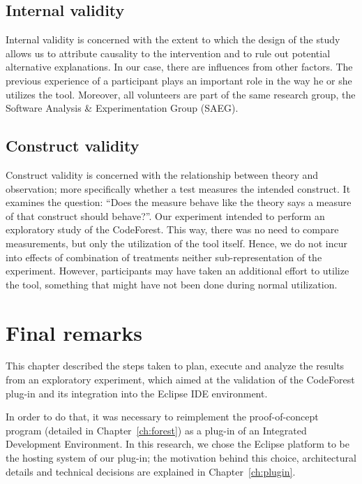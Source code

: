 \subsection{Internal validity}

Internal validity is concerned with the extent to which the design of the
study allows us to attribute causality to the intervention and to rule out
potential alternative explanations. In our case, there are influences from other
factors. The previous experience of a participant plays an important role in the
way he or she utilizes the tool. Moreover, all volunteers are part of the same
research group, the Software Analysis \& Experimentation Group (SAEG).

\subsection{Construct validity}

Construct validity is concerned with the relationship between theory and
observation; more specifically whether a test measures the intended construct.
It examines the question: ``Does the measure behave like the theory says a
measure of that construct should behave?''. Our experiment intended to perform
an exploratory study of the CodeForest. This way, there was no need to compare
measurements, but only the utilization of the tool itself. Hence, we do not
incur into effects of combination of treatments neither sub-representation of
the experiment. However, participants may have taken an additional effort to
utilize the tool, something that might have not been done during normal
utilization.

\section{Final remarks}

This chapter described the steps taken to plan, execute and analyze the results
from an exploratory experiment, which aimed at the validation of the CodeForest
plug-in and its integration into the Eclipse IDE environment.

In order to do that, it was necessary to reimplement the proof-of-concept
program (detailed in Chapter~\ref{ch:forest}) as a plug-in of an Integrated
Development Environment. In this research, we chose the Eclipse platform to
be the hosting system of our plug-in; the motivation behind this choice,
architectural details and technical decisions are explained in
Chapter~\ref{ch:plugin}.

